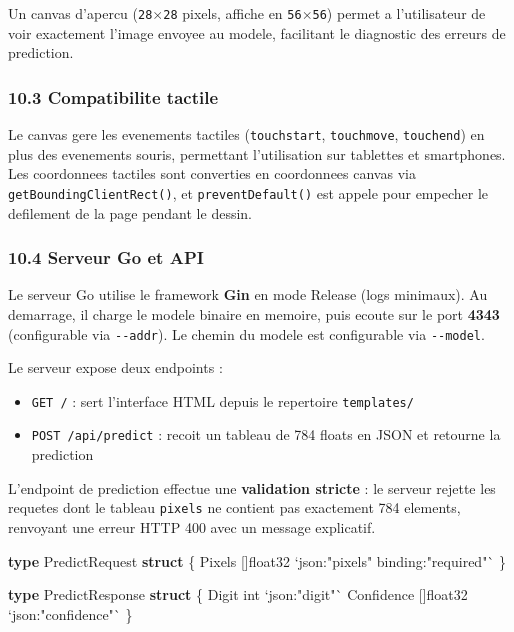 \documentclass[
  letterpaper,
  DIV=11,
  numbers=noendperiod]{scrartcl}
\newenvironment{Shaded}{\begin{snugshade}}{\end{snugshade}}
\newcommand{\DataTypeTok}[1]{\textcolor[rgb]{0.68,0.00,0.00}{#1}}
\newcommand{\KeywordTok}[1]{\textcolor[rgb]{0.00,0.23,0.31}{\textbf{#1}}}
\newcommand{\NormalTok}[1]{\textcolor[rgb]{0.00,0.23,0.31}{#1}}
\newcommand{\StringTok}[1]{\textcolor[rgb]{0.13,0.47,0.30}{#1}}
\providecommand{\tightlist}{%
  \setlength{\itemsep}{0pt}\setlength{\parskip}{0pt}}
\begin{document}
Un canvas d'apercu (\texttt{28$\times$28} pixels, affiche en \texttt{56$\times$56}) permet a l'utilisateur de voir exactement l'image envoyee au modele, facilitant le diagnostic des erreurs de prediction.

\subsubsection{10.3 Compatibilite tactile}\label{compatibilite-tactile}

Le canvas gere les evenements tactiles (\texttt{touchstart}, \texttt{touchmove}, \texttt{touchend}) en plus des evenements souris, permettant l'utilisation sur tablettes et smartphones. Les coordonnees tactiles sont converties en coordonnees canvas via \texttt{getBoundingClientRect()}, et \texttt{preventDefault()} est appele pour empecher le defilement de la page pendant le dessin.

\subsubsection{10.4 Serveur Go et API}\label{serveur-go}

Le serveur Go utilise le framework \textbf{Gin} en mode Release (logs minimaux). Au demarrage, il charge le modele binaire en memoire, puis ecoute sur le port \textbf{4343} (configurable via \texttt{-{}-addr}). Le chemin du modele est configurable via \texttt{-{}-model}.

Le serveur expose deux endpoints :
\begin{itemize}
\tightlist
\item \texttt{GET /} : sert l'interface HTML depuis le repertoire \texttt{templates/}
\item \texttt{POST /api/predict} : recoit un tableau de 784 floats en JSON et retourne la prediction
\end{itemize}

L'endpoint de prediction effectue une \textbf{validation stricte} : le serveur rejette les requetes dont le tableau \texttt{pixels} ne contient pas exactement 784 elements, renvoyant une erreur HTTP 400 avec un message explicatif.

\begin{Shaded}
\begin{Highlighting}[]
\KeywordTok{type}\NormalTok{ PredictRequest }\KeywordTok{struct}\NormalTok{ \{}
\NormalTok{    Pixels []}\DataTypeTok{float32}\NormalTok{ }\StringTok{`json:"pixels" binding:"required"`}
\NormalTok{\}}

\KeywordTok{type}\NormalTok{ PredictResponse }\KeywordTok{struct}\NormalTok{ \{}
\NormalTok{    Digit      }\DataTypeTok{int}\NormalTok{       }\StringTok{`json:"digit"`}
\NormalTok{    Confidence []}\DataTypeTok{float32}\NormalTok{ }\StringTok{`json:"confidence"`}
\NormalTok{\}}
\end{Highlighting}
\end{Shaded}
\end{document}
